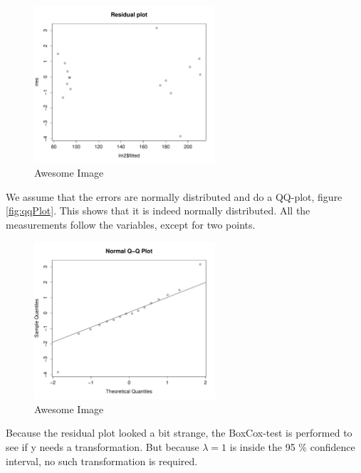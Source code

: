 \begin{figure}[H]
    \centering
    \includegraphics[width=0.6\textwidth]{PDF/residualPlot.pdf}
    \caption{Awesome Image}
    \label{fig:residual}
\end{figure}

We assume that the errors are normally distributed and do a QQ-plot, figure \ref{fig:qqPlot}. This shows that it is indeed normally distributed. All the measurements follow the variables, except for two points.

\begin{figure}[H]
    \centering
    \includegraphics[width=0.6\textwidth]{PDF/qqPlot.pdf}
    \caption{Awesome Image}
    \label{fig:awesome_image}
\end{figure}

Because the residual plot looked a bit strange, the BoxCox-test is performed to see if y needs a transformation. But because $\lambda = 1$ is inside the 95 $\%$ confidence interval, no such transformation is required. 

